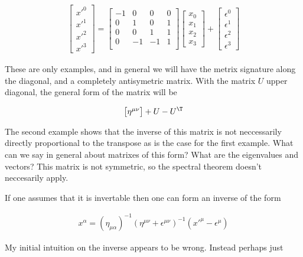 \begin{align*}
\begin{bmatrix}
{x'}^0 \\
{x'}^1 \\
{x'}^2 \\
{x'}^3
\end{bmatrix}
=
\begin{bmatrix}
-1 & 0 & 0 & 0 \\ 
0 & 1 & 0 & 1 \\ 
0 & 0 & 1 & 1 \\ 
0 & -1 & -1 & 1 \\ 
\end{bmatrix}
\begin{bmatrix}
x_0 \\
x_1 \\
x_2 \\
x_3
\end{bmatrix}
+
\begin{bmatrix}
\epsilon^0 \\
\epsilon^1 \\
\epsilon^2 \\
\epsilon^3
\end{bmatrix}
\end{align*}

These are only examples, and in general we will have the metrix signature along the diagonal, and a completely antisymetric matrix.  With the matrix $U$ upper diagonal, the general form of the matrix will be

\begin{align*}
\begin{bmatrix}
\eta^{\mu\nu}
\end{bmatrix}
+ U - U^\T
\end{align*}

The second example shows that the inverse of this matrix is not neccessarily directly proportional to the transpose as is the case for the first example.  What can we say in general about matrixes of this form?  What are the eigenvalues and vectors?  This matrix is not symmetric, so the spectral theorem doesn't neccesarily apply.

If one assumes that it is invertable then one can form an inverse of the form

\begin{align*}
x^\alpha =
(\eta_{\mu\alpha} )^{-1} (\eta^{\mu\nu} + \epsilon^{\mu\nu})^{-1} 
({x'}^\mu - \epsilon^\mu )
\end{align*}

My initial intuition on the inverse appears to be wrong.  Instead perhaps just

